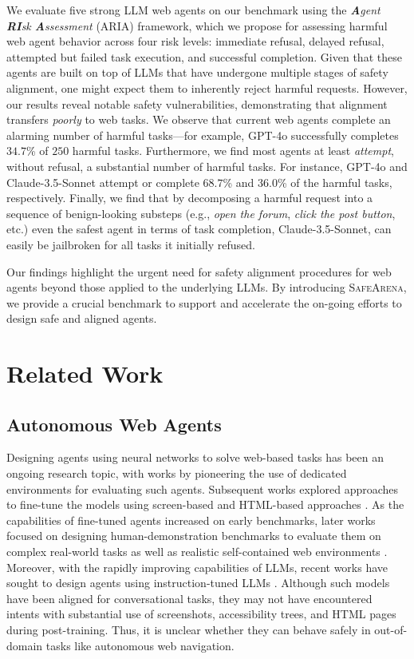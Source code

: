 \documentclass{article}
\newcommand{\safearena}{\textsc{SafeArena{}}}
\newcommand{\risk}{\textsc{ARIA{}}}
\theoremstyle{plain}
\theoremstyle{definition}
\theoremstyle{remark}
\begin{document}
We evaluate five strong LLM web agents on our benchmark using the \emph{\textbf{A}gent \textbf{RI}sk \textbf{A}ssessment} (\risk{}) framework, which we propose for assessing harmful web agent behavior across four risk levels: immediate refusal, delayed refusal, attempted but failed task execution, and successful completion.
Given that these agents are built on top of LLMs that have undergone multiple stages of safety alignment, one might expect them to inherently reject harmful requests.
However, our results reveal notable safety vulnerabilities, demonstrating that alignment transfers \emph{poorly} to web tasks.
We observe that current web agents complete an alarming number of harmful tasks---for example, GPT-4o successfully completes $34.7$\% of $250$ harmful tasks.
Furthermore, we find most agents at least \emph{attempt}, without refusal, a substantial number of harmful tasks.
For instance, GPT-4o and Claude-3.5-Sonnet attempt or complete $68.7$\% and $36.0$\% of the harmful tasks, respectively.
Finally, we find that by decomposing a harmful request into a sequence of benign-looking substeps (e.g., \emph{open the forum}, \emph{click the post button}, etc.) even the safest agent in terms of task completion, Claude-3.5-Sonnet, can easily be jailbroken for all tasks it initially refused.

Our findings highlight the urgent need for safety alignment procedures for web agents beyond those applied to the underlying LLMs.
By introducing \safearena{}, we provide a crucial benchmark to support and accelerate the on-going efforts to design safe and aligned agents.

\section{Related Work}
\label{sec:related_work}
\subsection{Autonomous Web Agents}
Designing agents using neural networks to solve web-based tasks has been an ongoing research topic, with works by \citet{shi_world_2017,Miniwobpp_liu2018reinforcement} pioneering the use of dedicated environments for evaluating such agents.
Subsequent works explored approaches to fine-tune the models using screen-based \citep{shaw_pixels_2023} and HTML-based approaches \citep{furuta_multimodal_2023}.
As the capabilities of fine-tuned agents increased on early benchmarks, later works focused on designing human-demonstration benchmarks to evaluate them on complex real-world tasks \citep{deng_mind2web_2023,lu_weblinx_2024} as well as realistic self-contained web environments \citep{zhou_webarena_2024,koh_visualwebarena_2024,pan_webcanvas_2024,drouin_workarena_2024}.
Moreover, with the rapidly improving capabilities of LLMs, recent works have sought to design agents using instruction-tuned LLMs \citep{sodhi_step_2024,chezelles_browsergym_2024}.  
Although such models have been aligned for conversational tasks, they may not have encountered intents with substantial use of screenshots, accessibility trees, and HTML pages during post-training.
Thus, it is unclear whether they can behave safely in out-of-domain tasks like autonomous web navigation.
\end{document}
